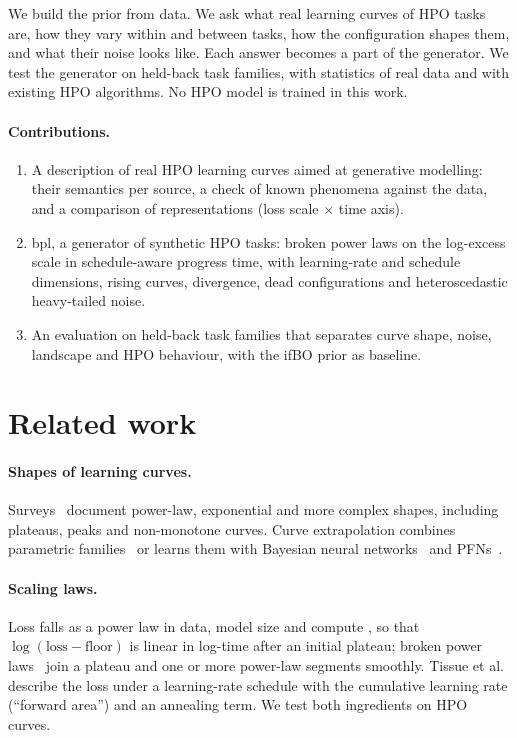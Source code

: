 \documentclass[10pt]{article}
\newcommand{\bpl}{\textsf{bpl}}
\begin{document}
We build the prior from data. We ask what real learning curves of HPO tasks are, how they vary within and between
tasks, how the configuration shapes them, and what their noise looks like. Each answer becomes a part of the
generator. We test the generator on held-back task families, with statistics of real data and with existing HPO
algorithms. No HPO model is trained in this work.

\paragraph{Contributions.}
\begin{enumerate}
  \item A description of real HPO learning curves aimed at generative modelling: their semantics per source, a
    check of known phenomena against the data, and a comparison of representations (loss scale $\times$ time axis).
  \item \bpl{}, a generator of synthetic HPO tasks: broken power laws on the log-excess scale in schedule-aware
    progress time, with learning-rate and schedule dimensions, rising curves, divergence, dead configurations and
    heteroscedastic heavy-tailed noise.
  \item An evaluation on held-back task families that separates curve shape, noise, landscape and HPO behaviour,
    with the ifBO prior as baseline.
\end{enumerate}

\section{Related work}

\paragraph{Shapes of learning curves.} Surveys~\cite{viering2022shape,mohr2022learning} document power-law,
exponential and more complex shapes, including plateaus, peaks and non-monotone curves. Curve extrapolation
combines parametric families~\cite{domhan2015speeding} or learns them with Bayesian neural
networks~\cite{klein2017learning} and PFNs~\cite{adriaensen2023efficient}.
\paragraph{Scaling laws.} Loss falls as a power law in data, model size and compute
\cite{hestness2017deep,kaplan2020scaling}, so that $\log(\text{loss} - \text{floor})$ is linear in log-time
after an initial plateau; broken power laws~\cite{caballero2023broken} join a plateau and one or more power-law
segments smoothly. Tissue et al.~\cite{tissue2024scaling} describe the loss under a learning-rate schedule with the
cumulative learning rate (``forward area'') and an annealing term. We test both ingredients on HPO curves.
\end{document}
